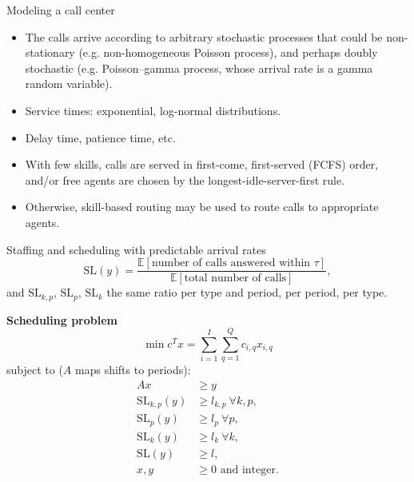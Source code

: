 \documentclass[aspectratio=169]{beamer}
\begin{document}
\begin{frame}{Modeling a call center}
	\begin{itemize}
		\item{} The calls arrive according to arbitrary stochastic processes that could be non-stationary (e.g. non-homogeneous Poisson process), and perhaps doubly stochastic (e.g. Poisson--gamma process, whose arrival rate is a gamma random variable).
		\item{} Service times: exponential, log-normal distributions.
		\item{} Delay time,  patience time, etc.
		\item{} With few skills, calls are served in first-come, first-served (FCFS) order, and/or free agents are chosen by the longest-idle-server-first rule.
		\item{} Otherwise, {\color{blue}skill-based routing} may be used to route calls to appropriate agents.
	\end{itemize}
\end{frame}

\begin{frame}{Staffing and scheduling with predictable arrival rates}
	\small
	\[
	\text{SL}(y) = \frac{\mathbb{E}[\text{number of calls answered within } \tau]}{\mathbb{E}[\text{total number of calls}]},
	\]
	and $\text{SL}_{k,p}$, $\text{SL}_p$, $\text{SL}_k$ the same ratio per type and period, per period, per type.

	\textbf{Scheduling problem}	
	\[
	\min {c}^T{x} = \sum_{i=1}^I\sum_{q=1}^Q c_{i,q}x_{i,q}
	\]
	subject to ($A$ maps shifts to periods):
	\begin{equation} \tag{P1}
		\begin{aligned}
			{Ax} &\geq {y} \\
			\text{SL}_{k,p}({y}) &\geq l_{k,p} ~\forall k,p, \\
			\text{SL}_{p}({y}) &\geq l_{p} ~\forall p, \\
			\text{SL}_{k}({y}) &\geq l_{k} ~\forall k, \\
			\text{SL}(y) &\geq l,\\
			{x},{y}&\geq 0 \text{ and integer}  \text{.}\\
		\end{aligned}
	\end{equation}
\end{frame}
\end{document}
